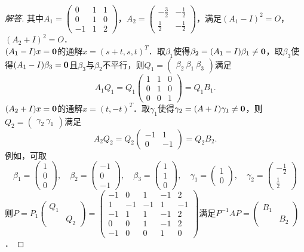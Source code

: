 \documentclass[a4paper,fontset=windows]{ctexbook}
\theoremstyle{definition}
\begin{document}
\begin{proof}[解答]
其中$A_1=\begin{pmatrix}0&1&1 \\ 0&1&0 \\ -1&1&2\end{pmatrix}$，$A_2=\begin{pmatrix}-\frac{3}{2}&-\frac{1}{2} \\ \frac{1}{2}&-\frac{1}{2}\end{pmatrix}$，满足$(A_1-I)^2=O$，$(A_2+I)^2=O$．\\[5pt]
$(A_1-I)x={\bf 0}$的通解$x=(s+t,s,t)^T$．取$\beta_1$使得$\beta_2=(A_1-I)\beta_1\ne{\bf 0}$，取$\beta_3$使得$(A_1-I)\beta_3={\bf 0}$且$\beta_3$与$\beta_2$不平行，则$Q_1=\begin{pmatrix}\beta_2~\beta_1~\beta_3\end{pmatrix}$满足
$$A_1Q_1=Q_1\begin{pmatrix}1&1&0 \\ 0&1&0 \\ 0&0&1\end{pmatrix}=Q_1B_1.$$
$(A_2+I)x={\bf 0}$的通解$x=(t,-t)^T$．取$\gamma_1$使得$\gamma_2=(A+I)\gamma_1\ne{\bf 0}$，则$Q_2=\begin{pmatrix}\gamma_2~\gamma_1\end{pmatrix}$满足
$$A_2Q_2=Q_2\begin{pmatrix}-1&1 \\ 0&-1\end{pmatrix}=Q_2B_2.$$
例如，可取
$$\beta_1=\begin{pmatrix}1 \\ 0 \\ 0\end{pmatrix},\quad\beta_2=\begin{pmatrix}-1 \\ 0 \\ -1\end{pmatrix},\quad\beta_3=\begin{pmatrix}1 \\ 1 \\ 0\end{pmatrix},\quad\gamma_1=\begin{pmatrix}1 \\ 0\end{pmatrix},\quad\gamma_2=\begin{pmatrix}-\frac{1}{2} \\ \frac{1}{2}\end{pmatrix}$$
则$P=P_1\begin{pmatrix}Q_1& \\ &Q_2\end{pmatrix}=\begin{pmatrix}-1&0&1&-1&2 \\ 1&-1&-1&1&-1 \\ -1&1&1&-1&2 \\ 0&0&1&-1&2\\ -1&0&0&1&0\end{pmatrix}$满足$P^{-1}AP=\begin{pmatrix}B_1& \\ &B_2\end{pmatrix}$．
\end{proof}
\end{document}
